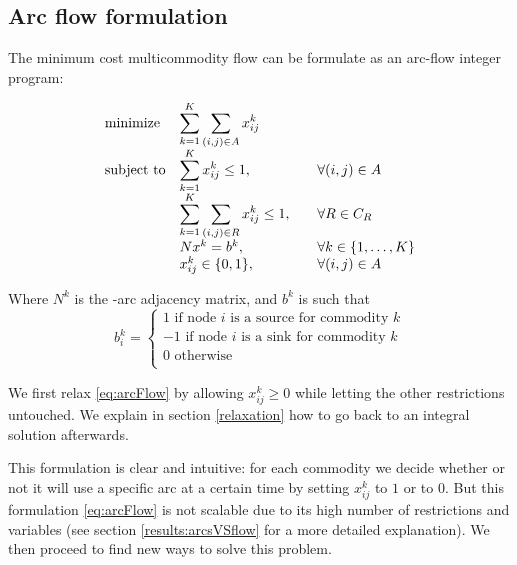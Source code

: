 \documentclass[14pt,a4paper]{article}
\theoremstyle{definition}
\numberwithin{equation}{subsection}
\begin{document}
\subsection{Arc flow formulation}

The minimum cost multicommodity flow can be formulate as an arc-flow integer program: 

\begin{equation}
\begin{array}{ll@{}ll}
\text{minimize}  & \displaystyle\sum\limits_{k=1}^{K}\sum_{(i,j)\in A} x_{ij}^k &\\
\text{subject to}& \displaystyle\sum\limits_{k=1}^{K}   x_{ij}^k \leq 1,  &\forall (i,j) \in A \\
& \displaystyle\sum\limits_{k=1}^{K}\sum_{(i,j) \in R}   x_{ij}^k \leq 1, \quad \quad  &\forall R \in C_R \\
& Nx^k = b^k,  &\forall k \in \{1,\ldots,K\}\\
&                                                x_{ij}^k \in \{0,1\}, & \forall (i,j)\in A
\end{array}
\label{eq:arcFlow}
\end{equation}

Where $N^k$ is the -arc adjacency matrix, and $b^k$ is such that 
\[
b^k_i=\left\{
\begin{array}{ll}
1 \text{ if node } i \text{ is a source for commodity } k\\
-1 \text{ if node } i \text{ is a sink for commodity } k\\
0 \text{ otherwise}\\
\end{array}
\right.
\]


We first relax \eqref{eq:arcFlow} by allowing $x_{ij}^k \geq 0$ while letting the other restrictions untouched. We explain in section \ref{relaxation} how to go back to an integral solution afterwards.

This formulation is clear and intuitive: for each commodity we decide whether or not it will use a specific arc at a certain time by setting $x_{ij}^k$ to $1$ or to $0$. But this formulation \eqref{eq:arcFlow} is not scalable due to its high number of restrictions and variables (see section \ref{results:arcsVSflow} for a more detailed explanation). We then proceed to find new ways to solve this problem.
\end{document}
